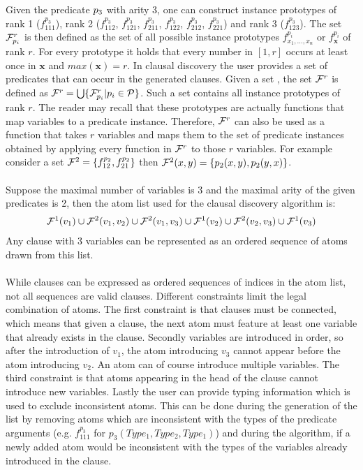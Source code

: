 Given the predicate $p_3$ with arity 3, one can construct instance prototypes of rank 1 ($f^{p_3}_{111}$), rank 2 ($f^{p_3}_{112}$, $f^{p_3}_{121}$, $f^{p_3}_{211}$, $f^{p_3}_{122}$, $f^{p_3}_{212}$, $f^{p_3}_{221}$) and rank 3 ($f^{p_3}_{123}$).
The set $\mathcal{F}^r_{p_i}$ is then defined as the set of all possible instance prototypes $f^{p_i}_{x_1, ..., x_n}$ or $f^{p_i}_\mathbf{x}$ of rank $r$.
For every prototype it holds that every number in $[1, r]$ occurs at least once in $\mathbf{x}$ and $max(\mathbf{x}) = r$.
In clausal discovery the user provides a set  of predicates that can occur in the generated clauses.
Given a set , the set $\mathcal{F}^r$ is defined as $\mathcal{F}^r = \bigcup \{\mathcal{F}^r_{p_i} | p_i \in \mathcal{P}\}$.
Such a set contains all instance prototypes of rank $r$.
The reader may recall that these prototypes are actually functions that map variables to a predicate instance.
Therefore, $\mathcal{F}^r$ can also be used as a function that takes $r$ variables and maps them to the set of predicate instances obtained by applying every function in $\mathcal{F}^r$ to those $r$ variables.
For example consider a set $\mathcal{F}^2 = \{f^{p_2}_{12}, f^{p_2}_{21}\}$ then $\mathcal{F}^2(x, y) = \{p_2(x, y), p_2(y, x)\}$.
\\\\
Suppose the maximal number of variables is 3 and the maximal arity of the given predicates is 2, then the atom list used for the clausal discovery algorithm is:
\begin{align*}
\mathcal{F}^1(v_1) \cup \mathcal{F}^2(v_1, v_2) \cup \mathcal{F}^2(v_1, v_3) \cup \mathcal{F}^1(v_2) \cup \mathcal{F}^2(v_2, v_3) \cup \mathcal{F}^1(v_3)
\end{align*}
Any clause with 3 variables can be represented as an ordered sequence of atoms drawn from this list.
\\\\
While clauses can be expressed as ordered sequences of indices in the atom list, not all sequences are valid clauses.
Different constraints limit the legal combination of atoms.
The first constraint is that clauses must be connected, which means that given a clause, the next atom must feature at least one variable that already exists in the clause.
Secondly variables are introduced in order, so after the introduction of $v_1$, the atom introducing $v_3$ cannot appear before the atom introducing $v_2$.
An atom can of course introduce multiple variables.
The third constraint is that atoms appearing in the head of the clause cannot introduce new variables.
Lastly the user can provide typing information which is used to exclude inconsistent atoms.
This can be done during the generation of the list by removing atoms which are inconsistent with the types of the predicate arguments (e.g. $f^{p_3}_{111}$ for $p_3(Type_1, Type_2, Type_1)$) and during the algorithm, if a newly added atom would be inconsistent with the types of the variables already introduced in the clause.

